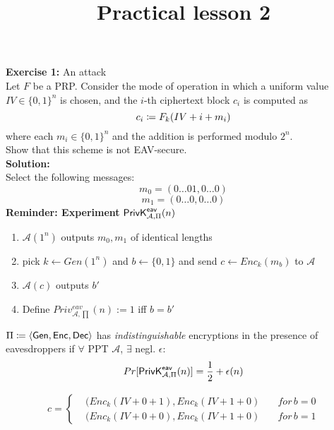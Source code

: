 \documentclass[12pt]{article}
\title{Practical lesson 2}
\begin{document}
\maketitle

\textbf{Exercise 1:} An attack\\
Let $F$ be a PRP. Consider the mode of operation in which a uniform value $IV \in \{0,1\}^n$ is chosen, and the $i$-th ciphertext block $c_i$ is computed as\\
 \begin{equation*}
 c_i \coloneqq F_k(IV+i+m_i)
 \end{equation*}
  where each $m_i \in \{0,1\}^n$ and the addition is performed modulo $2^n$. \\
 Show that this scheme is not EAV-secure.\\
 \textbf{Solution:}\\
 Select the following messages:
 \begin{equation*}
m_0 = (0\dots01, 0\dots0)
 \end{equation*} 
 \begin{equation*}
m_1 = (0\dots0, 0\dots0)
 \end{equation*} 
 \textbf{Reminder: Experiment} $\mathsf{PrivK}_{\mathcal{A},\Pi}^\mathsf{eav}(n)$
\begin{enumerate}
\item $\mathcal{A}(1^n)$ outputs $m_0,m_1$ of identical lengths
\item pick $k \leftarrow Gen(1^n)$ and  $b \leftarrow \{0,1\}$ and send $c \leftarrow Enc_k(m_b)$ to $\mathcal{A}$
 \item $\mathcal{A}(c)$ outputs $b'$
 \item Define $Priv_{\mathcal{A},\prod}^{eav}(n):=1$ iff $b=b'$
\end{enumerate}
$\Pi \coloneqq \langle \operatorname{\mathsf{Gen}}, \operatorname{\mathsf{Enc}}, \operatorname{\mathsf{Dec}} \rangle $ has \emph{indistinguishable} encryptions in the presence of eavesdroppers if $\forall$ PPT $\mathcal{A}$, $\exists$ negl. $\epsilon$:
\begin{equation*}
Pr[\mathsf{PrivK}_{\mathcal{A},\Pi}^\mathsf{eav}(n)] = \frac{1}{2} + \epsilon(n)
\end{equation*}


\begin{align*}
c = 
\left\{
    \begin {aligned}
         & (Enc_k(IV+0+1), Enc_k(IV+1+0) \quad & for \,b=0 \\
         & (Enc_k(IV+0+0), Enc_k(IV+1+0) \quad & for \,b=1
    \end{aligned}
\right.
\end{align*}
\end{document}
